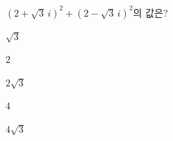 $(2+\sqrt{3}\,i)^2+(2-\sqrt{3}\,i)^2$의 값은?
\begin{choices32}{\rule[-3ex]{0pt}{8ex}$\sqrt{3}$}{\rule[-3ex]{0pt}{8ex}$2$}{\rule[-3ex]{0pt}{8ex}$2\sqrt{3}$}{\rule[-3ex]{0pt}{8ex}$4$}{\rule[-3ex]{0pt}{8ex}$4\sqrt{3}$}\end{choices32}
